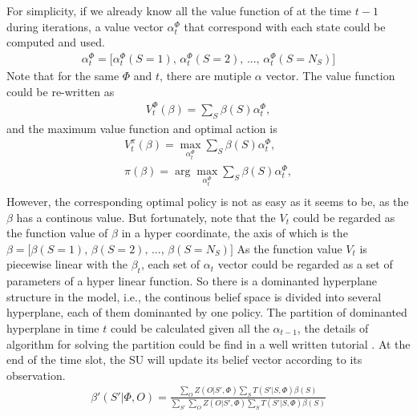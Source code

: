 \documentclass[conference]{IEEEtran}
\begin{document}
For simplicity, if we already know all the value function of at the time \(t-1\) during iterations,
a value vector \(\alpha_t^\Phi\) that correspond with each state could be computed and used.
\begin{align}
	\alpha_t^\Phi = \lbrack \alpha_t^\Phi\left(S = 1\right),\,
	\alpha_t^\Phi\left(S = 2\right),\,...,\,\alpha_t^\Phi\left(S = N_S\right)\rbrack
\end{align}
Note that for the same \(\Phi\) and \(t\), there are mutiple \(\alpha\) vector.
The value function could be re-written as
\begin{align}
	V_t^\Phi\left(\beta\right) = \sum\limits_{S}\beta\left(S\right)\alpha_t^\Phi,
\end{align}
and the maximum value function and optimal action is 
\begin{equation}
\begin{aligned}
	V_t^\pi\left(\beta\right) =
	\underset{\alpha_t^\Phi}{\max}\sum\limits_{S}\beta\left(S\right)\alpha_t^\Phi,\\
	\pi\left(\beta\right) =
	\arg\underset{\alpha_t^\Phi}{\max}\sum\limits_{S}\beta\left(S\right)\alpha_t^\Phi,\\
\end{aligned}
\end{equation}
However, the corresponding optimal policy is not as easy as it seems to be, as the \(\beta\) has a continous value.
But fortunately, note that the \(V_t\) could be regarded as the function value of \(\beta\) in a hyper coordinate, 
the axis of which is the 
\(\beta = \lbrack \beta\left(S = 1\right),\,\beta\left(S = 2\right),\,...,\,\beta\left(S = N_S\right)\rbrack\)
As the function value \(V_t\) is piecewise linear with the \(\beta_t\), 
each set of \(\alpha_t\) vector could be regarded as a set of parameters of a hyper linear function.
So there is a dominanted hyperplane structure in the model, i.e., 
the continous belief space is divided into several hyperplane, each of them dominanted by one policy.
The partition of dominanted hyperplane in time \(t\) could be calculated given all the \(\alpha_{t-1}\),
the details of algorithm for solving the partition could be find in a well written tutorial \cite{}.
At the end of the time slot, the SU will update its belief vector according to its observation.
\begin{align}
	\beta'\left(S'|\Phi, O\right) = \frac{\sum\limits_{O}Z\left(O|S',\Phi\right)\sum\limits_{S}
	T\left(S'|S,\Phi\right)\beta\left(S\right)}
	{\sum\limits_{S'}\sum\limits_{O}Z\left(O|S',\Phi\right)\sum\limits_{S}T\left(S'|S,\Phi\right)\beta\left(S\right)}
\end{align}
\end{document}
